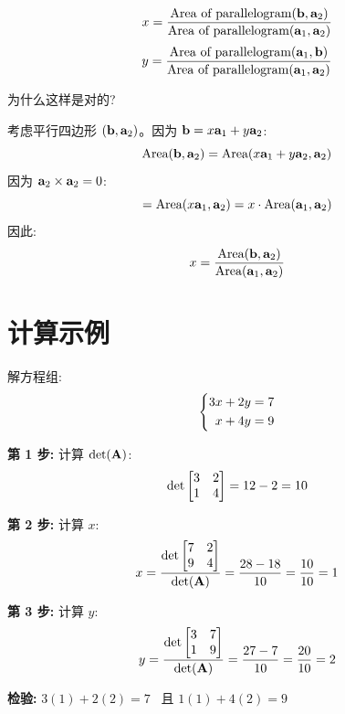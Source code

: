 \begin{center}
\end{center}

\begin{theorem}[面积解释]
\[
x = \frac{\text{Area of parallelogram}(\mathbf{b}, \mathbf{a}_2)}{\text{Area of parallelogram}(\mathbf{a}_1, \mathbf{a}_2)}
\]
\[
y = \frac{\text{Area of parallelogram}(\mathbf{a}_1, \mathbf{b})}{\text{Area of parallelogram}(\mathbf{a}_1, \mathbf{a}_2)}
\]
\end{theorem}

\begin{intuition}
为什么这样是对的?

考虑平行四边形 $(\mathbf{b}, \mathbf{a}_2)$。因为 $\mathbf{b} = x\mathbf{a}_1 + y\mathbf{a}_2$:
\[
\text{Area}(\mathbf{b}, \mathbf{a}_2) = \text{Area}(x\mathbf{a}_1 + y\mathbf{a}_2, \mathbf{a}_2)
\]
因为 $\mathbf{a}_2 \times \mathbf{a}_2 = 0$:
\[
= \text{Area}(x\mathbf{a}_1, \mathbf{a}_2) = x \cdot \text{Area}(\mathbf{a}_1, \mathbf{a}_2)
\]
因此:
\[
x = \frac{\text{Area}(\mathbf{b}, \mathbf{a}_2)}{\text{Area}(\mathbf{a}_1, \mathbf{a}_2)}
\]
\end{intuition}

\section{计算示例}

\begin{example}
解方程组:
\[
\left\{\begin{aligned} 
3x + 2y &= 7 \\
x + 4y &= 9
 \end{aligned}\right.
\]

\textbf{第 1 步:} 计算 $\det(\mathbf{A})$:
\[
\det\begin{bmatrix} 3 & 2 \\ 1 & 4 \end{bmatrix} = 12 - 2 = 10
\]

\textbf{第 2 步:} 计算 $x$:
\[
x = \frac{\det\begin{bmatrix} 7 & 2 \\ 9 & 4 \end{bmatrix}}{\det(\mathbf{A})} = \frac{28 - 18}{10} = \frac{10}{10} = 1
\]

\textbf{第 3 步:} 计算 $y$:
\[
y = \frac{\det\begin{bmatrix} 3 & 7 \\ 1 & 9 \end{bmatrix}}{\det(\mathbf{A})} = \frac{27 - 7}{10} = \frac{20}{10} = 2
\]

\textbf{检验:} $3(1) + 2(2) = 7$ \checkmark\ 且 $1(1) + 4(2) = 9$ \checkmark
\end{example}

